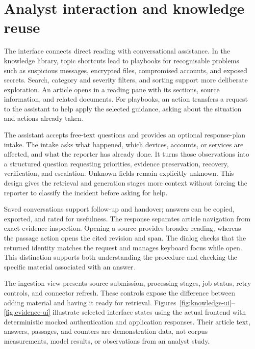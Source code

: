 \section{Analyst interaction and knowledge reuse}

The interface connects direct reading with conversational assistance. In the knowledge library, topic shortcuts lead to playbooks for recognisable problems such as suspicious messages, encrypted files, compromised accounts, and exposed secrets. Search, category and severity filters, and sorting support more deliberate exploration. An article opens in a reading pane with its sections, source information, and related documents. For playbooks, an action transfers a request to the assistant to help apply the selected guidance, asking about the situation and actions already taken.

The assistant accepts free-text questions and provides an optional response-plan intake. The intake asks what happened, which devices, accounts, or services are affected, and what the reporter has already done. It turns those observations into a structured question requesting priorities, evidence preservation, recovery, verification, and escalation. Unknown fields remain explicitly unknown. This design gives the retrieval and generation stages more context without forcing the reporter to classify the incident before asking for help.

Saved conversations support follow-up and handover; answers can be copied, exported, and rated for usefulness. The response separates article navigation from exact-evidence inspection. Opening a source provides broader reading, whereas the passage action opens the cited revision and span. The dialog checks that the returned identity matches the request and manages keyboard focus while open. This distinction supports both understanding the procedure and checking the specific material associated with an answer.

The ingestion view presents source submission, processing stages, job status, retry controls, and connector refresh. These controls expose the difference between adding material and having it ready for retrieval. Figures~\ref{fig:knowledge-ui}--\ref{fig:evidence-ui} illustrate selected interface states using the actual frontend with deterministic mocked authentication and application responses. Their article text, answers, passages, and counters are demonstration data, not corpus measurements, model results, or observations from an analyst study.

